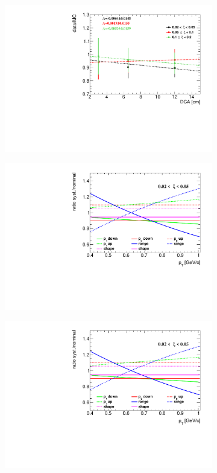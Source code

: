  \begin{figure}[h!]
 	\centering
 	\begin{subfigure}{.49\textwidth}
 		\includegraphics[width=\textwidth,page=1]{chapters/chrgSTAR/img/DCAproton/Ratio.pdf}
 	\end{subfigure}%
 	\begin{subfigure}{.49\textwidth}
 		\includegraphics[width=\textwidth,page=1]{chapters/chrgSTAR/img/DCAproton/p_bkg.pdf}
 	\end{subfigure}
 	\begin{subfigure}{.49\textwidth}
 		\includegraphics[width=\textwidth,page=2]{chapters/chrgSTAR/img/DCAproton/p_bkg.pdf}

\end{subfigure}
\end{figure}
